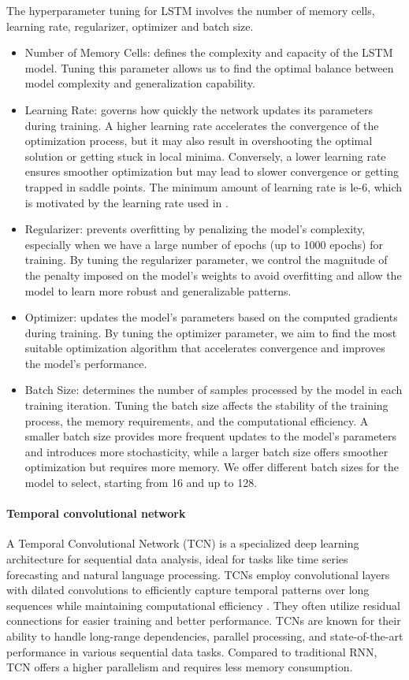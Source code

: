 \documentclass{article}
\begin{document}
The hyperparameter tuning for LSTM involves the number of memory cells, learning rate, regularizer, optimizer and batch size. 
\begin{itemize}
  \item Number of Memory Cells: defines the complexity and capacity of the LSTM model. Tuning this parameter allows us to find the optimal balance between model complexity and generalization capability. 
  \item Learning Rate: governs how quickly the network updates its parameters during training. A higher learning rate accelerates the convergence of the optimization process, but it may also result in overshooting the optimal solution or getting stuck in local minima. Conversely, a lower learning rate ensures smoother optimization but may lead to slower convergence or getting trapped in saddle points. The minimum amount of learning rate is le-6, which is motivated by the learning rate used in \cite{krauss2017deep}.
  \item Regularizer: prevents overfitting by penalizing the model's complexity, especially when we have a large number of epochs (up to 1000 epochs) for training. By tuning the regularizer parameter, we control the magnitude of the penalty imposed on the model's weights to avoid overfitting and allow the model to learn more robust and generalizable patterns.
  \item Optimizer: updates the model's parameters based on the computed gradients during training. By tuning the optimizer parameter, we aim to find the most suitable optimization algorithm that accelerates convergence and improves the model's performance.
  \item Batch Size: determines the number of samples processed by the model in each training iteration. Tuning the batch size affects the stability of the training process, the memory requirements, and the computational efficiency. A smaller batch size provides more frequent updates to the model's parameters and introduces more stochasticity, while a larger batch size offers smoother optimization but requires more memory. We offer different batch sizes for the model to select, starting from 16 and up to 128. 
\end{itemize}


\paragraph{Temporal convolutional network}
A Temporal Convolutional Network (TCN) is a specialized deep learning architecture for sequential data analysis, ideal for tasks like time series forecasting and natural language processing. TCNs employ convolutional layers with dilated convolutions to efficiently capture temporal patterns over long sequences while maintaining computational efficiency \citep{bai2018empirical}. They often utilize residual connections for easier training and better performance. TCNs are known for their ability to handle long-range dependencies, parallel processing, and state-of-the-art performance in various sequential data tasks. Compared to traditional RNN, TCN offers a higher parallelism and requires less memory consumption. 
\end{document}
